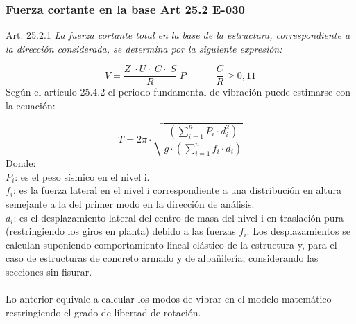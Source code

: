 \subsubsection{Fuerza cortante en la base Art 25.2 E-030}

\begin{mybox3}{Art. 25.2.1}
\textit{La fuerza cortante total en la base de la estructura, correspondiente a la dirección considerada, se determina por la siguiente expresión:}
\end{mybox3}
\begin{equation}
V=\frac{Z\;\cdot U\cdot\;C\cdot\;S}{R}\;P\;\;\;\;\;\;\;\;\;\;\;\frac{C}{R}\geqslant 0,11
\end{equation}
\noindent
Según el articulo 25.4.2 el periodo fundamental de vibración puede estimarse con la ecuación:

\begin{equation}
T=2\pi\cdot \displaystyle\sqrt{\frac{\left (\displaystyle\sum_{i=1}^{n} P_{i}\cdot d_{i}^{2}\right )}{g\cdot\left (\displaystyle\sum_{i=1}^{n}f_{i}\cdot d_{i}  \right ) }}
\end{equation}
\noindent Donde:\\
$P_{i}$: es el peso sísmico en el nivel i.\\
$f_{i}$: es la fuerza lateral en el nivel i correspondiente a una distribución en altura semejante a la del primer modo en la dirección de análisis.\\
$d_{i}$: es el desplazamiento lateral del centro de masa del nivel  i en 
traslación pura (restringiendo los giros en planta) debido a las fuerzas 
$f_{i}$. Los desplazamientos se calculan suponiendo comportamiento lineal 
elástico de la estructura y, para el caso de estructuras de concreto 
armado y de albañilería, considerando las secciones sin fisurar.\\
\\
Lo anterior equivale a calcular los modos de vibrar en el modelo matemático restringiendo el grado de libertad de rotación.

